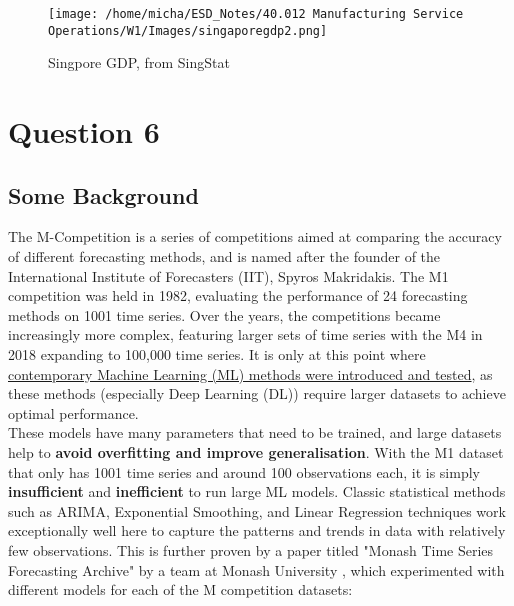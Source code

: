 \documentclass[12pt]{article}
\begin{document}
\begin{figure}[H]
    \centering
    \texttt{[image: /home/micha/ESD\_Notes/40.012 Manufacturing Service Operations/W1/Images/singaporegdp2.png]}
    \caption{Singpore GDP, from SingStat}
    \label{fig:5-sggdp2}
\end{figure} 

\newpage 

\section*{Question 6}





\subsection*{Some Background}

The M-Competition is a series of competitions aimed at comparing the accuracy of different forecasting methods, and is named after the founder of the International Institute of Forecasters (IIT), Spyros Makridakis. The M1 competition was held in 1982, evaluating the performance of 24 forecasting methods on 1001 time series. Over the years, the competitions became increasingly more complex, featuring larger sets of time series with the M4 in 2018 expanding to 100,000 time series. It is only at this point where \href{https://www.unic.ac.cy/iff/research/forecasting/m-competitions/m5/}{contemporary Machine Learning (ML) methods were introduced and tested}, as these methods (especially Deep Learning (DL)) require larger datasets to achieve optimal performance. \\ 

\noindent These models have many parameters that need to be trained, and large datasets help to \textbf{avoid overfitting and improve generalisation}. With the M1 dataset that only has 1001 time series and around 100 observations each, it is simply \textbf{insufficient} and \textbf{inefficient} to run large ML models. Classic statistical methods such as ARIMA, Exponential Smoothing, and Linear Regression techniques work exceptionally well here to capture the patterns and trends in data with relatively few observations. This is further proven by a paper titled "Monash Time Series Forecasting Archive" by a team at Monash University \cite{godahewa2021monash}, which experimented with different models for each of the M competition datasets: 
\end{document}
